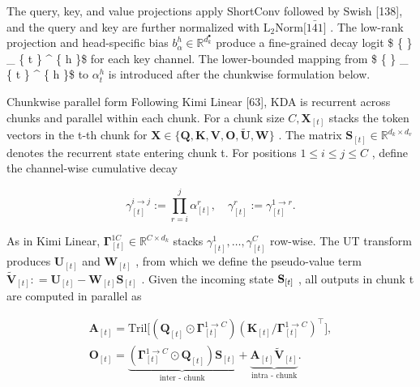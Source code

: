 \documentclass[
  10
]{article}
\begin{document}
The query, key, and value projections apply ShortConv followed by Swish
{[}138{]}, and the query and key are further normalized with
\(\mathrm { L _ { 2 } N o r m \bar { \lbrack 1 4 1 \rbrack } }\) . The
low-rank projection and head-specific bias
\(b _ { \alpha } ^ { h } \in \mathbb { R } ^ { d _ { k } ^ { \bullet } }\)
produce a fine-grained decay logit \$ \{  \} \_ \{ t \}
\^{} \{ h \}\$ for each key channel. The lower-bounded mapping from \$
\{  \} \_ \{ t \} \^{} \{ h \}\$ to
\(\alpha _ { t } ^ { h }\) is introduced after the chunkwise formulation
below.

Chunkwise parallel form Following Kimi Linear {[}63{]}, KDA is recurrent
across chunks and parallel within each chunk. For a chunk size
\(C , \mathbf { X } _ { [ t ] }\) stacks the token vectors in the t-th
chunk for
\(\mathbf { X } \in \{ \mathbf { Q } , \mathbf { K } , \mathbf { V } , \mathbf { O } , \mathbf { \tilde { U } } , \mathbf { W } \}\)
. The matrix
\(\mathbf { S } _ { [ t ] } \in \mathbb { R } ^ { d _ { k } \times d _ { v } }\)
denotes the recurrent state entering chunk t. For positions
\(1 \leq i \leq j \leq C\) , define the channel-wise cumulative decay

\[
\gamma_ {[ t ]} ^ {i \rightarrow j} := \prod_ {r = i} ^ {j} \alpha_ {[ t ]} ^ {r}, \quad \gamma_ {[ t ]} ^ {r} := \gamma_ {[ t ]} ^ {1 \rightarrow r}.\tag{3}
\]

As in Kimi Linear,
\(\mathbf { \Gamma } _ { [ t ] } ^ { 1  C } \in \mathbb { R } ^ { C \times d _ { k } }\)
stacks
\(\gamma _ { [ t ] } ^ { 1 } , \ldots , \gamma _ { [ t ] } ^ { C }\)
row-wise. The UT transform produces \(\mathbf { U } _ { [ t ] }\) and
\(\mathbf { W } _ { [ t ] }\) , from which we define the pseudo-value
term
\(\widetilde { \mathbf { V } } _ { [ t ] } : = \mathbf { U } _ { [ t ] } - \mathbf { W } _ { [ t ] } \mathbf { S } _ { [ t ] }\)
. Given the incoming state \({ \bf S } _ { [ t ] }\) , all outputs in
chunk t are computed in parallel as

\[
\begin{array}{l} \mathbf {A} _ {[ t ]} = \mathrm{Tril} \Big [ (\mathbf {Q} _ {[ t ]} \odot \mathbf {\Gamma} _ {[ t ]} ^ {1 \to C}) (\mathbf {K} _ {[ t ]} / \mathbf {\Gamma} _ {[ t ]} ^ {1 \to C}) ^ {\top} \Big ], \\ \mathbf {O} _ {[ t ]} = \underbrace {(\mathbf {\Gamma} _ {[ t ]} ^ {1 \to C} \odot \mathbf {Q} _ {[ t ]}) \mathbf {S} _ {[ t ]}} _ {\text {inter - chunk}} + \underbrace {\mathbf {A} _ {[ t ]} \widetilde {\mathbf {V}} _ {[ t ]}} _ {\text {intra - chunk}}. \end{array}\tag{4}
\]
\end{document}
